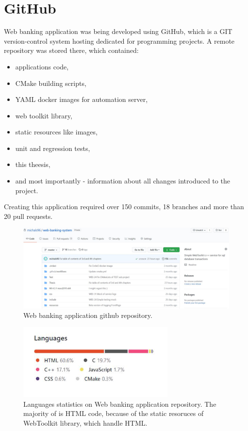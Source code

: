 \documentclass[a4paper,12pt]{book}
\newcommand\tab[1][1cm]{\hspace*{#1}}
\begin{document}
\section{GitHub}
{
\tab Web banking application was being developed using GitHub, which is a GIT version-control system hosting dedicated for programming projects. A remote repository was stored there, which contained:

\begin{itemize}
	\item applications code,
	\item CMake building scripts,
	\item YAML docker images for automation server,
	\item web toolkit library,
	\item static resources like images,
	\item unit and regression tests,
	\item this theesis,
	\item and most importantly - information about all changes introduced to the project.
\end{itemize}
	
\bigskip
Creating this application required over 150 commits, 18 branches and more than 20 pull requests.

\begin{figure}[h]
  \centering
    \includegraphics[width=1.0\textwidth]{repo}
    \caption{Web banking application github repository.~\cite{repo}}
\end{figure} 

\begin{figure}[h]
  \centering
    \includegraphics[width=0.7\textwidth]{languages}
    \caption{Languages statistics on Web banking application repository. The majority of is HTML code, because of the static resoruces of WebToolkit library, which handle HTML.~\cite{repo}}
\end{figure} 
    
}
\end{document}
